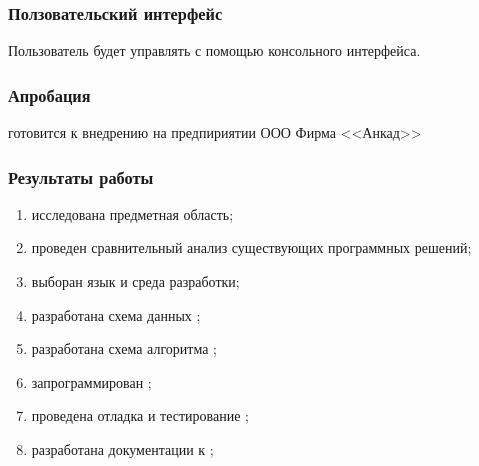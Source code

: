 \begin{frame}
\frametitle{Ползовательский интерфейс}
    Пользователь будет управлять {\ProgModule} с помощью
    консольного интерфейса.

\end{frame}

\begin{frame}
\frametitle{Апробация}
    {\ProgModule} готовится к внедрению на предпириятии ООО Фирма <<Анкад>>
\end{frame}

\begin{frame}
\frametitle{Результаты работы}
    \begin{enumerate}
        \item исследована предметная область;
        \item проведен сравнительный анализ существующих программных решений;
        \item выборан язык и среда разработки;
        \item разработана схема данных {\ProgModule};
        \item разработана схема алгоритма {\ProgModule};
        \item запрограммирован {\ProgModule};
        \item проведена отладка и тестирование {\ProgModule};
        \item разработана документации к {\ProgModule};
    \end{enumerate}
\end{frame}
